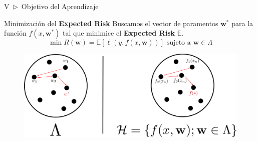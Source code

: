 \documentclass[xcolor=dvipsnames]{beamer}
\begin{document}
    \begin{frame}{V~$\rhd$~Objetivo del Aprendizaje}
        \begin{block}{Minimización del \textbf{Expected Risk}}
            Buscamos el vector de paramentos $\mathbf{w}^{*}$ para la función $f(x, \mathbf{w}^{*})$ tal que minimice el \textbf{Expected Risk} $\mathbb{E}$.
            \begin{equation*}
                \min R(\mathbf{w})=\mathbb{E}\left[\ell\left(y,f\left(x, \mathbf{w}\right)\right)\right]\text{ sujeto a } \mathbf{w}\in\Lambda
            \end{equation*}
        \end{block}
        \begin{figure}
            \centering
            \includegraphics[width=0.85\linewidth]{imgs/def03/measure07.png}
        \end{figure}
    \end{frame}
\end{document}
